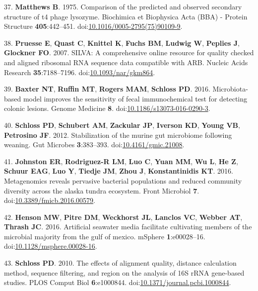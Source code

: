 \documentclass[11pt,]{article}
\begin{document}
\hypertarget{ref-Matthews1975}{}
37. \textbf{Matthews B}. 1975. Comparison of the predicted and observed
secondary structure of t4 phage lysozyme. Biochimica et Biophysica Acta
(BBA) - Protein Structure \textbf{405}:442--451.
doi:\href{https://doi.org/10.1016/0005-2795(75)90109-9}{10.1016/0005-2795(75)90109-9}.

\hypertarget{ref-Pruesse2007}{}
38. \textbf{Pruesse E}, \textbf{Quast C}, \textbf{Knittel K},
\textbf{Fuchs BM}, \textbf{Ludwig W}, \textbf{Peplies J},
\textbf{Glockner FO}. 2007. SILVA: A comprehensive online resource for
quality checked and aligned ribosomal RNA sequence data compatible with
ARB. Nucleic Acids Research \textbf{35}:7188--7196.
doi:\href{https://doi.org/10.1093/nar/gkm864}{10.1093/nar/gkm864}.

\hypertarget{ref-Baxter2016}{}
39. \textbf{Baxter NT}, \textbf{Ruffin MT}, \textbf{Rogers MAM},
\textbf{Schloss PD}. 2016. Microbiota-based model improves the
sensitivity of fecal immunochemical test for detecting colonic lesions.
Genome Medicine \textbf{8}.
doi:\href{https://doi.org/10.1186/s13073-016-0290-3}{10.1186/s13073-016-0290-3}.

\hypertarget{ref-Schloss2012}{}
40. \textbf{Schloss PD}, \textbf{Schubert AM}, \textbf{Zackular JP},
\textbf{Iverson KD}, \textbf{Young VB}, \textbf{Petrosino JF}. 2012.
Stabilization of the murine gut microbiome following weaning. Gut
Microbes \textbf{3}:383--393.
doi:\href{https://doi.org/10.4161/gmic.21008}{10.4161/gmic.21008}.

\hypertarget{ref-Johnston2016}{}
41. \textbf{Johnston ER}, \textbf{Rodriguez-R LM}, \textbf{Luo C},
\textbf{Yuan MM}, \textbf{Wu L}, \textbf{He Z}, \textbf{Schuur EAG},
\textbf{Luo Y}, \textbf{Tiedje JM}, \textbf{Zhou J},
\textbf{Konstantinidis KT}. 2016. Metagenomics reveals pervasive
bacterial populations and reduced community diversity across the alaska
tundra ecosystem. Front Microbiol \textbf{7}.
doi:\href{https://doi.org/10.3389/fmicb.2016.00579}{10.3389/fmicb.2016.00579}.

\hypertarget{ref-Henson2016}{}
42. \textbf{Henson MW}, \textbf{Pitre DM}, \textbf{Weckhorst JL},
\textbf{Lanclos VC}, \textbf{Webber AT}, \textbf{Thrash JC}. 2016.
Artificial seawater media facilitate cultivating members of the
microbial majority from the gulf of mexico. mSphere
\textbf{1}:e00028--16.
doi:\href{https://doi.org/10.1128/msphere.00028-16}{10.1128/msphere.00028-16}.

\hypertarget{ref-Schloss2010}{}
43. \textbf{Schloss PD}. 2010. The effects of alignment quality,
distance calculation method, sequence filtering, and region on the
analysis of 16S rRNA gene-based studies. PLOS Comput Biol
\textbf{6}:e1000844.
doi:\href{https://doi.org/10.1371/journal.pcbi.1000844}{10.1371/journal.pcbi.1000844}.
\end{document}
